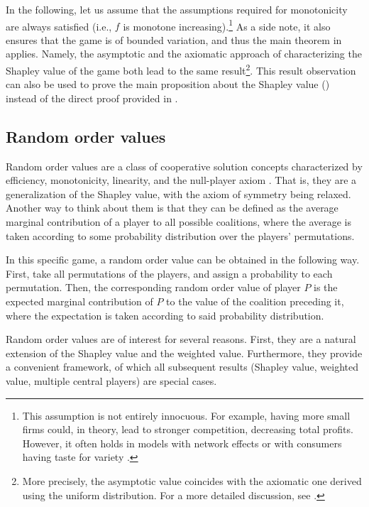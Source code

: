 In the following, let us assume that the assumptions required for monotonicity are always satisfied (i.e., $f$ is monotone increasing).\footnote{
    This assumption is not entirely innocuous.
    For example, having more small firms could, in theory, lead to stronger competition, decreasing total profits.
    However, it often holds in models with network effects \parencite{rochet2003platform} or with consumers having taste for variety \parencite{anderson2020aggregative}.
}
As a side note, it also ensures that the game is of bounded variation, and thus the main theorem in \textcite{fogelman1980asymptotic} applies.
Namely, the asymptotic and the axiomatic approach of characterizing the Shapley value of the game both lead to the same result\footnote{
    More precisely, the asymptotic value coincides with the axiomatic one derived using the uniform distribution.
    For a more detailed discussion, see \textcite{fogelman1980asymptotic}.
}.
This result observation can also be used to prove the main proposition about the Shapley value () instead of the direct proof provided in .

\subsection{Random order values}

Random order values are a class of cooperative solution concepts characterized by efficiency, monotonicity, linearity, and the null-player axiom \parencite{weber1988probabilistic}.
That is, they are a generalization of the Shapley value, with the axiom of symmetry being relaxed.
Another way to think about them is that they can be defined as the average marginal contribution of a player to all possible coalitions, where the average is taken according to some probability distribution over the players' permutations.

In this specific game, a random order value can be obtained in the following way.
First, take all permutations of the players, and assign a probability to each permutation.
Then, the corresponding random order value of player $P$ is the expected marginal contribution of $P$ to the value of the coalition preceding it, where the expectation is taken according to said probability distribution.

Random order values are of interest for several reasons.
First, they are a natural extension of the Shapley value and the weighted value.
Furthermore, they provide a convenient framework, of which all subsequent results (Shapley value, weighted value, multiple central players) are special cases.

